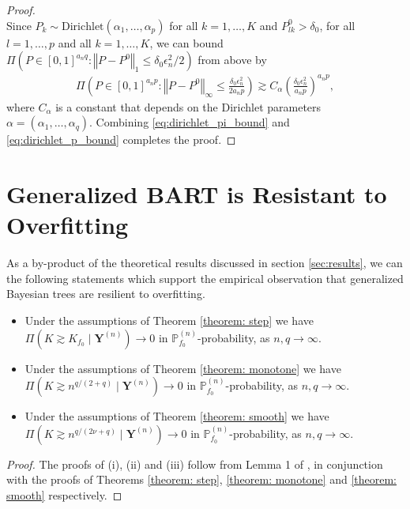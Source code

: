 \documentclass[12pt]{article}
\newcommand{\bm}[1]{\boldsymbol{#1}}
\renewcommand{\P}{\mathbb{P}}
\newcommand{\Y}{\bm{Y}}
\newcommand{\norm}[1]{\left\Vert#1\right\Vert}
\newcommand{\1}{\mathbb{I}}
\def\Y{\bm{Y}}
\renewcommand{\P}{\mathbb{P}}
\renewcommand{\Y}{\bm{Y}}
\theoremstyle{plain}
\theoremstyle{definition}
\theoremstyle{remark}
\begin{document}
\begin{proof}
\begin{equation}
\end{equation}
Since $P_k \sim \text{Dirichlet}(\alpha_1,\dots,\alpha_p)$ for all $k=1,\dots,K$ and $P_{lk}^0 > \delta_0$, for all $l=1,\dots,p$ and all $k=1,\dots,K$, we can bound  $\Pi \left (P \in [0,1]^{a_nq}: \norm{P-P^0}_1 \le \delta_0 \epsilon_n^2/2 \right)$ from above by
\begin{align}\label{eq:dirichlet_p_bound}
\Pi \left (P \in [0,1]^{a_np}: \norm{P-P^0}_\infty \le \frac{\delta_0 \epsilon_n^2}{2a_n p} \right) \gtrsim C_{\alpha} (\frac{\delta_0 \epsilon_n^2}{a_n p})^{a_n p},
\end{align}
where $C_{\alpha}$ is a constant that depends on the Dirichlet parameters $\alpha=(\alpha_1,\dots,\alpha_q)$. Combining \eqref{eq:dirichlet_pi_bound} and \eqref{eq:dirichlet_p_bound} completes the proof.
\end{proof}

\section{Generalized BART is Resistant to Overfitting}\label{parsimony} 
As a by-product of the theoretical results discussed in section \ref{sec:results}, we can the following statements which support the empirical observation that generalized Bayesian trees are resilient to overfitting.
\begin{itemize}
\item[(i)] Under the assumptions of Theorem \ref{theorem: step}  we have 
$
\Pi\left(K \gtrsim K_{f_0} \mid \Y^{(n)}\right) \to 0
$
in $\P_{f_0}^{(n)}$-probability, as $n,q \to \infty$.

\item[(ii)] Under the assumptions of Theorem \ref{theorem: monotone} we have 
$
\Pi\left(K \gtrsim n^{q/(2+q)} \mid \Y^{(n)}\right) \to 0
$
in $\P_{f_0}^{(n)}$-probability, as $n,q \to \infty$.

\item[(iii)] Under the assumptions of Theorem \ref{theorem: smooth}  we have 
$
\Pi\left(K \gtrsim n^{q/(2\nu+q)} \mid \Y^{(n)}\right) \to 0
$
in $\P_{f_0}^{(n)}$-probability, as $n,q \to \infty$.
\end{itemize}
\begin{proof}
The proofs of (i), (ii) and (iii) follow from Lemma 1 of \cite{ghosal2007convergence}, in conjunction with the proofs of Theorems \ref{theorem: step}, \ref{theorem: monotone} and \ref{theorem: smooth} respectively.
\end{proof}
\end{document}
